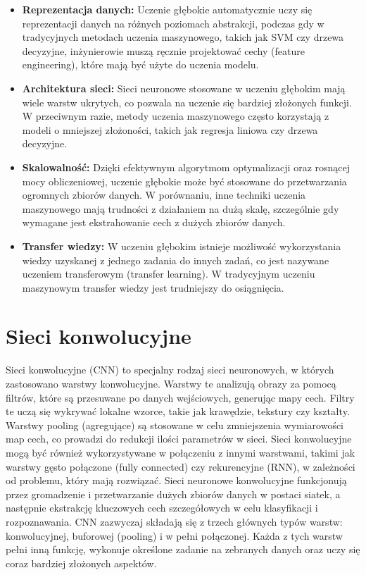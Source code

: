 \begin{itemize}
\item \textbf{Reprezentacja danych:} Uczenie głębokie automatycznie uczy się reprezentacji danych na różnych poziomach abstrakcji, podczas gdy w tradycyjnych metodach uczenia maszynowego, takich jak SVM czy drzewa decyzyjne, inżynierowie muszą ręcznie projektować cechy (feature engineering), które mają być użyte do uczenia modelu.
\item \textbf{Architektura sieci:} Sieci neuronowe stosowane w uczeniu głębokim mają wiele warstw ukrytych, co pozwala na uczenie się bardziej złożonych funkcji. W przeciwnym razie, metody uczenia maszynowego często korzystają z modeli o mniejszej złożoności, takich jak regresja liniowa czy drzewa decyzyjne.
\item \textbf{Skalowalność:} Dzięki efektywnym algorytmom optymalizacji oraz rosnącej mocy obliczeniowej, uczenie głębokie może być stosowane do przetwarzania ogromnych zbiorów danych. W porównaniu, inne techniki uczenia maszynowego mają trudności z działaniem na dużą skalę, szczególnie gdy wymagane jest ekstrahowanie cech z dużych zbiorów danych.
\item \textbf{Transfer wiedzy:} W uczeniu głębokim istnieje możliwość wykorzystania wiedzy uzyskanej z jednego zadania do innych zadań, co jest nazywane uczeniem transferowym (transfer learning). W tradycyjnym uczeniu maszynowym transfer wiedzy jest trudniejszy do osiągnięcia.
\end{itemize}

\section{Sieci konwolucyjne}
Sieci konwolucyjne (CNN) to specjalny rodzaj sieci neuronowych, w których zastosowano warstwy konwolucyjne. Warstwy te analizują obrazy za pomocą filtrów, które są przesuwane po danych wejściowych, generując mapy cech. Filtry te uczą się wykrywać lokalne wzorce, takie jak krawędzie, tekstury czy kształty. Warstwy pooling (agregujące) są stosowane w celu zmniejszenia wymiarowości map cech, co prowadzi do redukcji ilości parametrów w sieci. Sieci konwolucyjne mogą być również wykorzystywane w połączeniu z innymi warstwami, takimi jak warstwy gęsto połączone (fully connected) czy rekurencyjne (RNN), w zależności od problemu, który mają rozwiązać. Sieci neuronowe konwolucyjne funkcjonują przez gromadzenie i przetwarzanie dużych zbiorów danych w postaci siatek, a następnie ekstrakcję kluczowych cech szczegółowych w celu klasyfikacji i rozpoznawania. CNN zazwyczaj składają się z trzech głównych typów warstw: konwolucyjnej, buforowej (pooling) i w pełni połączonej. Każda z tych warstw pełni inną funkcję, wykonuje określone zadanie na zebranych danych oraz uczy się coraz bardziej złożonych aspektów.

